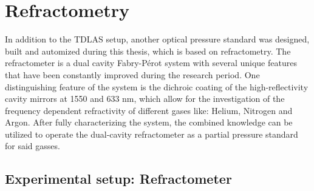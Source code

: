 \chapter{Refractometry}
In addition to the TDLAS setup, another optical pressure standard was designed, built and automized during this thesis, which is based on refractometry. The refractometer is a dual cavity Fabry-Pérot system with several unique features that have been constantly improved during the research period. One distinguishing feature of the system is the dichroic coating of the high-reflectivity cavity mirrors at 1550 and 633 nm, which allow for the investigation of the frequency dependent refractivity of different gases like: Helium, Nitrogen and Argon. After fully characterizing the system, the combined knowledge can be utilized to operate the dual-cavity refractometer as a partial pressure standard for said gasses.
\section{Experimental setup: Refractometer}
